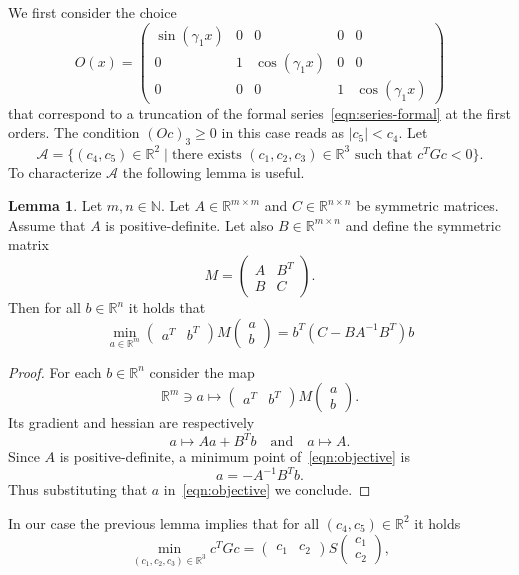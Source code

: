 \documentclass[a4paper,10pt,twoside]{amsbook}
\numberwithin{section}{chapter}
\numberwithin{equation}{chapter}
\theoremstyle{definition}
\newtheorem{lemma}[prop]{Lemma}
\begin{document}
We first consider the choice
\[
O(x)=\begin{pmatrix}
\sin(\gamma_1x) & 0 & 0 & 0 & 0 \\
0 & 1 & \cos(\gamma_1x) & 0 & 0 \\
0 & 0 & 0 & 1 & \cos(\gamma_1x)
\end{pmatrix}
\]
that correspond to a truncation of the formal series~\eqref{eqn:series-formal} at the first orders. The condition $(Oc)_3\ge0$ in this case reads as $|c_5|<c_4$. Let
\[
\mathscr{A}=\{(c_4,c_5)\in\mathbb{R}^2\;|\;\text{there exists $(c_1,c_2,c_3)\in\mathbb{R}^3$ such that $c^TGc<0$}\}.
\]
To characterize $\mathscr{A}$ the following lemma is useful.
\begin{lemma}
Let $m,n\in\mathbb{N}$. Let $A\in\mathbb{R}^{m\times m}$ and $C\in\mathbb{R}^{n\times n}$ be symmetric matrices. Assume that $A$ is positive-definite. Let also $B\in\mathbb{R}^{m\times n}$ and define the symmetric matrix
\[
M=\begin{pmatrix}
A & B^T \\
B & C
\end{pmatrix}.
\]
Then for all $b\in\mathbb{R}^n$ it holds that
\[
\min_{a\in\mathbb{R}^m}\begin{pmatrix}
a^T & b^T
\end{pmatrix}
M
\begin{pmatrix}
a \\
b
\end{pmatrix}=b^T(C-BA^{-1}B^T)b
\]
\end{lemma}
\begin{proof}
For each $b\in\mathbb{R}^n$ consider the map
\begin{equation}
\label{eqn:objective}
\mathbb{R}^m\ni a\mapsto
\begin{pmatrix}
a^T & b^T
\end{pmatrix}
M
\begin{pmatrix}
a \\
b
\end{pmatrix}.
\end{equation}
Its gradient and hessian are respectively
\[
a\mapsto Aa+B^Tb\quad\text{and}\quad a\mapsto A.
\]
Since $A$ is positive-definite, a minimum point of~\eqref{eqn:objective} is
\[
a=-A^{-1}B^Tb.
\]
Thus substituting that $a$ in~\eqref{eqn:objective} we conclude.
\end{proof}
In our case the previous lemma implies that for all $(c_4,c_5)\in\mathbb{R}^2$ it holds
\[
\min_{(c_1,c_2,c_3)\in\mathbb{R}^3}c^TGc=\begin{pmatrix}
c_1 & c_2
\end{pmatrix}
S
\begin{pmatrix}
c_1 \\ c_2
\end{pmatrix},
\]
\end{document}
